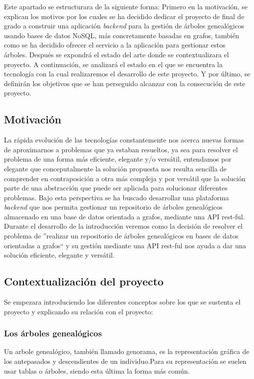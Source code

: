 
Este apartado se estructurara de la siguiente forma: Primero en la motivación, se explican los motivos por los cuales se ha decidido dedicar el proyecto de final de grado a construir una aplicación \textit{backend} para la gestión de árboles genealógicos usando bases de datos NoSQL, más concretamente basadas en grafos, también como se ha decidido ofrecer el servicio a la aplicación para gestionar estos árboles. Después se expondrá el estado del arte donde se contextualizara el proyecto. A continuación, se analizará el estado en el que se encuentra la tecnología con la cual realizaremos el desarrollo de este proyecto. Y por último, se definirán los objetivos que se han perseguido alcanzar con la consecución de este proyecto.

\subsection{Motivación}
La rápida evolución de las tecnologías constantemente nos acerca nuevas formas de aproximarnos a problemas que ya estaban resueltos, ya sea para resolver el problema de una forma más eficiente, elegante y/o versátil, entendamos por elegante que conceputalmente la solución propuesta nos resulta sencilla de comprender en contraposición a otra más compleja y por versátil que la solución parte de una abstracción que puede ser aplicada para solucionar diferentes problemas. Bajo esta perspectiva se ha buscado desarrollar una plataforma \textit{backend} que nos permita gestionar un repositorio de árboles genealógicos almacenado en una base de datos orientada a grafos, mediante una API rest-ful. Durante el desarrollo de la introducción veremos como la decisión de resolver el problema de ''realizar un repositorio de árboles genealógicos en bases de datos orientadas a grafos`` y su gestión  mediante una API rest-ful nos ayuda a dar una solución eficiente, elegante y versátil.\\
\newpage
\subsection{Contextualización del proyecto}
Se empezara introduciendo los diferentes conceptos sobre los que se sustenta el proyecto y explicando su relación con el proyecto:

\subsubsection{Los árboles genealógicos}
Un arbole genealógico, también llamado genorama, es la representación gráfica de los antepasados  y descendientes de un individuo.Para su representación  se suelen usar tablas o árboles, siendo esta última la forma más común.

